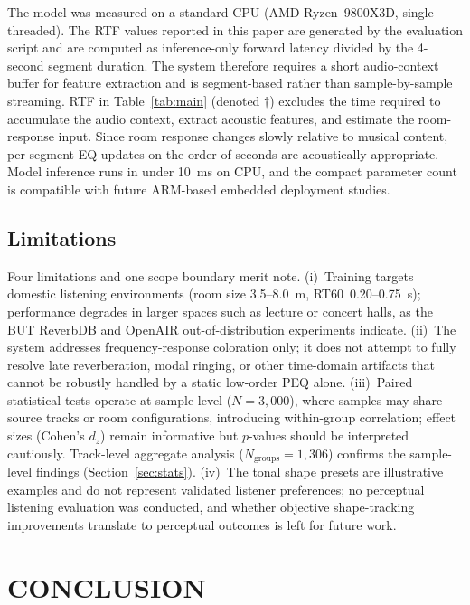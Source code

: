 \documentclass{aes2e}
\begin{document}
The model was measured on a standard CPU (AMD Ryzen~9800X3D,
single-threaded). The RTF values reported in this paper are generated by
the evaluation script and are computed as inference-only forward latency
divided by the 4-second segment duration. The system therefore requires a
short audio-context buffer for feature extraction and is segment-based
rather than sample-by-sample streaming.
RTF in Table~\ref{tab:main} (denoted $\dagger$) excludes the time required
to accumulate the audio context, extract acoustic features, and estimate
the room-response input.
Since room response changes slowly relative to musical content,
per-segment EQ updates on the order of seconds are acoustically appropriate.
Model inference runs in under 10~ms on CPU, and the compact parameter count
is compatible with future ARM-based embedded deployment studies.

\subsection{Limitations}

Four limitations and one scope boundary merit note.
(i)~Training targets domestic listening environments (room size
3.5--8.0~m, RT60~0.20--0.75~s); performance degrades in larger spaces
such as lecture or concert halls, as the BUT ReverbDB and OpenAIR
out-of-distribution experiments indicate.
(ii)~The system addresses frequency-response coloration only; it does not
attempt to fully resolve late reverberation, modal ringing, or other
time-domain artifacts that cannot be robustly handled by a static
low-order PEQ alone.
(iii)~Paired statistical tests operate at sample level ($N=3{,}000$),
where samples may share source tracks or room configurations, introducing
within-group correlation; effect sizes (Cohen's $d_z$) remain informative
but $p$-values should be interpreted cautiously. Track-level aggregate
analysis ($N_\text{groups}=1{,}306$) confirms the sample-level findings
(Section~\ref{sec:stats}).
(iv)~The tonal shape presets are illustrative examples and do not
represent validated listener preferences; no perceptual listening
evaluation was conducted, and whether objective shape-tracking
improvements translate to perceptual outcomes is left for future work.

\section{CONCLUSION}
\end{document}
